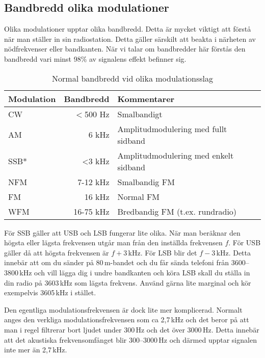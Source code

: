 \subsection{Bandbredd olika modulationer}

Olika modulationer upptar olika bandbredd. Detta är mycket viktigt att förstå
när man ställer in sin radiostation. Detta gäller särskilt att beakta i
närheten av nödfrekvenser eller bandkanten. När vi talar om bandbredder här
förstås den bandbredd vari minst 98\% av signalens effekt befinner sig.

\begin{table}[H]
\centering
\begin{tabular}{lrl}
	\textbf{Modulation} & \textbf{Bandbredd} & \textbf{Kommentarer}                  \\ \hline
	CW                  &          $<$500 Hz & Smalbandigt                           \\
	AM                  &              6 kHz & Amplitudmodulering med fullt sidband  \\
	SSB*                &              <3 kHz & Amplitudmodulering med enkelt sidband \\
	NFM                 &           7-12 kHz & Smalbandig FM                         \\
	FM                  &             16 kHz & Normal FM                             \\
	WFM                 &          16-75 kHz & Bredbandig FM (t.ex. rundradio)
\end{tabular}
\caption{Normal bandbredd vid olika modulationsslag}
\end{table}

För SSB gäller att USB och LSB fungerar lite olika. När man beräknar den
högsta eller lägsta frekvensen utgår man från den inställda frekvensen $f$.
För USB gäller då att högsta frekvensen är $f+3$\,kHz. För LSB blir det
$f-3$\,kHz. Detta innebär att om du sänder på 80\,m-bandet och du får sända
telefoni från 3600--3800\,kHz och vill lägga dig i undre bandkanten och köra
LSB skall du ställa in din radio på 3603\,kHz som lägsta frekvens. Använd
gärna lite marginal och kör exempelvis 3605\,kHz i stället.

Den egentliga modulationsfrekvensen är dock lite mer komplicerad. Normalt
anges den verkliga modulationsfrekvensen som ca 2,7\,kHz och det beror på att
man i regel filtrerar bort ljudet under 300\,Hz och det över 3000\,Hz. Detta
innebär att det akustiska frekvensomfånget blir 300--3000\,Hz och därmed
upptar signalen inte mer än 2,7\,kHz.

